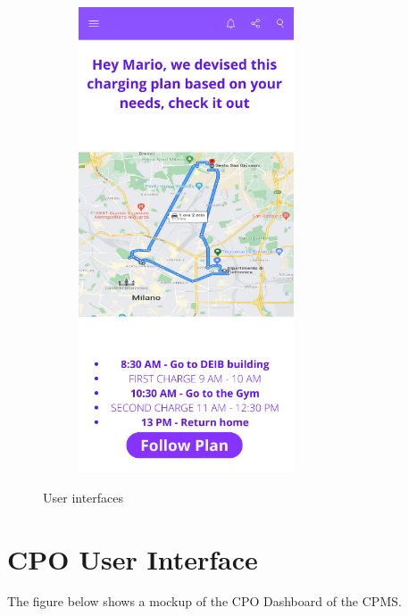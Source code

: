 \documentclass[12pt]{report}
\begin{document}
\begin{figure}[h]
\begin{subfigure}{0.49\textwidth}
        \includegraphics[width = 0.7\textwidth]{assets/ui4.png}
        \end{subfigure}
        \caption{User interfaces}
\end{figure}

\clearpage
\section{CPO User Interface}
The figure below shows a mockup of the CPO Dashboard of the CPMS.\\
\end{document}
